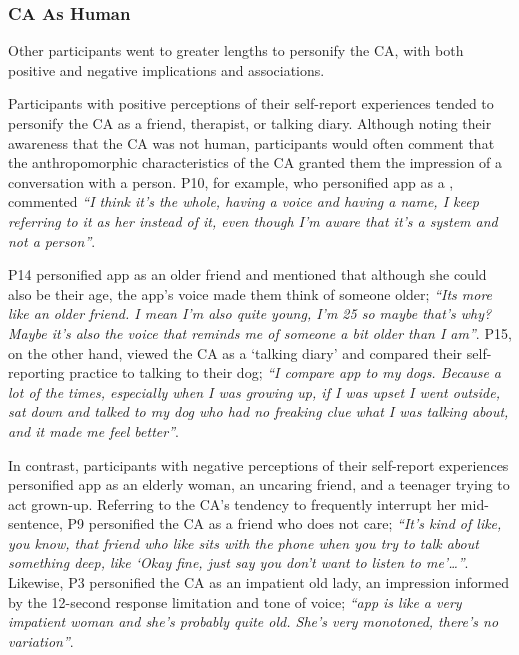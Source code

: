         \subsubsection{\ac{CA} As Human} %
        
            Other participants went to greater lengths to personify the \ac{CA}, with both positive and negative implications and associations.

            Participants with positive perceptions of their self-report experiences tended to personify the \ac{CA} as a friend, therapist, or talking diary. Although noting their awareness that the \ac{CA} was not human, participants would often comment that the anthropomorphic characteristics of the \ac{CA} granted them the impression of a conversation with a person. P10, for example, who personified \acl{app} as a , commented \textit{``I think it's the whole, having a voice and having a name, I keep referring to it as her instead of it, even though I'm aware that it's a system and not a person''}. 
            
            P14 personified \acl{app} as an older friend and mentioned that although she could also be their age, the \acl{app}'s voice made them think of someone older; \textit{``Its more like an older friend. I mean I'm also quite young, I'm 25 so maybe that's why? Maybe it's also the voice that reminds me of someone a bit older than I am''}. P15, on the other hand, viewed the \ac{CA} as a `talking diary' and compared their self-reporting practice to talking to their dog; \textit{``I compare \acl{app} to my dogs. Because a lot of the times, especially when I was growing up, if I was upset I went outside, sat down and talked to my dog who had no freaking clue what I was talking about, and it made me feel better''}.
            
            In contrast, participants with negative perceptions of their self-report experiences personified \acl{app} as an elderly woman, an uncaring friend, and a teenager trying to act grown-up. Referring to the \ac{CA}'s tendency to frequently interrupt her mid-sentence, P9 personified the \ac{CA} as a friend who does not care; \textit{``It's kind of like, you know, that friend who like sits with the phone when you try to talk about something deep, like `Okay fine, just say you don't want to listen to me'\ldots''}. Likewise, P3 personified the \ac{CA} as an impatient old lady, an impression informed by the 12-second response limitation and tone of voice; \textit{``\acl{app} is like a very impatient woman and she’s probably quite old. She’s very monotoned, there’s no variation''}.

